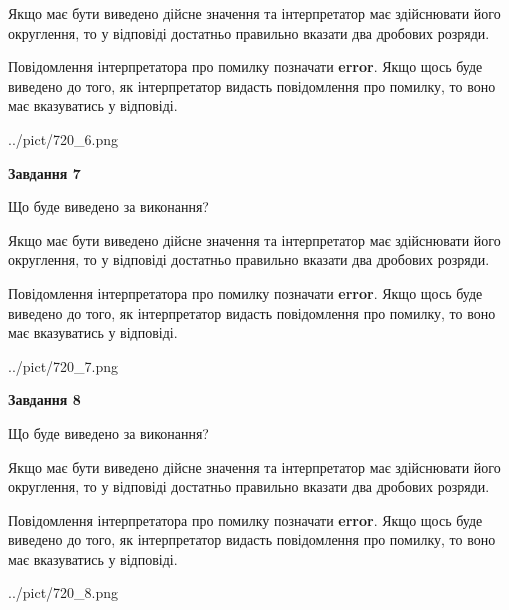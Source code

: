 \documentclass[12pt, ukrainian]{article}
\begin{document}
{\begin {Large}
Якщо має бути виведено дійсне значення та інтерпретатор має здійснювати його округлення, 
то у відповіді достатньо правильно вказати два дробових розряди.

Повідомлення інтерпретатора про помилку позначати \textbf{error}.
Якщо щось буде виведено до того, як інтерпретатор видасть повідомлення про помилку, 
то воно має вказуватись у відповіді. \par

\begin{center}
	{../pict/720_6.png}
\end{center}
\newpage

{\begin {center}\textbf{Завдання 7}\end {center}}\par
Що буде виведено за виконання? \par

Якщо має бути виведено дійсне значення та інтерпретатор має здійснювати його округлення, 
то у відповіді достатньо правильно вказати два дробових розряди.

Повідомлення інтерпретатора про помилку позначати \textbf{error}.
Якщо щось буде виведено до того, як інтерпретатор видасть повідомлення про помилку, 
то воно має вказуватись у відповіді. \par

\begin{center}
	{../pict/720_7.png}
\end{center}
\newpage

{\begin {center}\textbf{Завдання 8}\end {center}}\par
Що буде виведено за виконання? \par

Якщо має бути виведено дійсне значення та інтерпретатор має здійснювати його округлення, 
то у відповіді достатньо правильно вказати два дробових розряди.

Повідомлення інтерпретатора про помилку позначати \textbf{error}.
Якщо щось буде виведено до того, як інтерпретатор видасть повідомлення про помилку, 
то воно має вказуватись у відповіді. \par

\begin{center}
	{../pict/720_8.png}
\end{center}
\newpage


\end{Large}}
\end{document}
